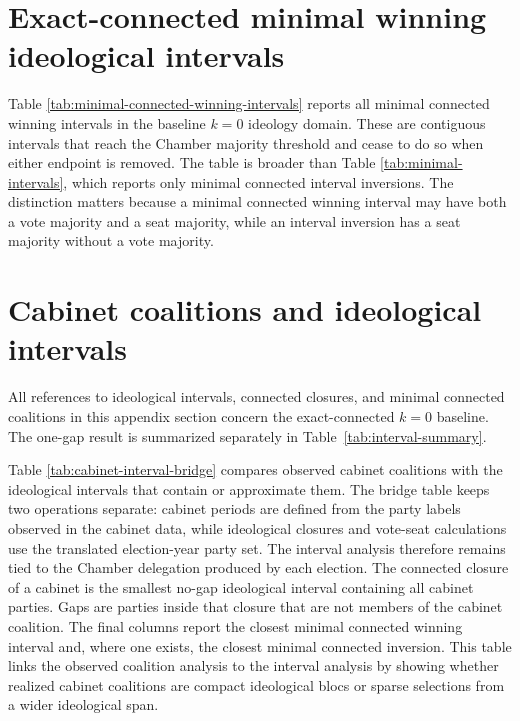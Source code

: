 \documentclass[11pt]{article}
\begin{document}



\section{Exact-connected minimal winning ideological intervals}
\label{app:minimal-connected-winning}

Table \ref{tab:minimal-connected-winning-intervals} reports all
minimal connected winning intervals in the baseline \(k=0\) ideology domain.
These are
contiguous intervals that reach the Chamber majority threshold and cease to do
so when either endpoint is removed. The table is broader than Table
\ref{tab:minimal-intervals}, which reports only minimal connected interval
inversions. The distinction matters because a minimal connected winning interval
may have both a vote majority and a seat majority, while an interval inversion
has a seat majority without a vote majority.




\section{Cabinet coalitions and ideological intervals}
\label{app:cabinet-interval-bridge}

All references to ideological intervals, connected closures, and minimal
connected coalitions in this appendix section concern the exact-connected
\(k=0\) baseline. The one-gap result is summarized separately in
Table~\ref{tab:interval-summary}.

Table \ref{tab:cabinet-interval-bridge} compares observed cabinet coalitions
with the ideological intervals that contain or approximate them. The bridge
table keeps two operations separate: cabinet periods are defined from the party
labels observed in the cabinet data, while ideological closures and vote-seat
calculations use the translated election-year party set. The interval analysis
therefore remains tied to the Chamber delegation produced by each election.
The connected closure of a cabinet is the smallest no-gap ideological interval
containing all cabinet parties. Gaps are parties inside that closure that are
not members of the cabinet coalition. The final columns report the closest
minimal connected winning interval and, where one exists, the closest minimal
connected inversion. This table links the observed coalition analysis to the
interval analysis by showing whether realized cabinet coalitions are compact
ideological blocs or sparse selections from a wider ideological span.
\end{document}

